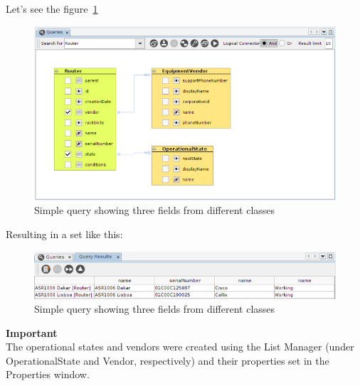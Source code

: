 \documentclass[a4paper]{article}
\begin{document}
	\newpage
	Let's see the figure~\ref{fig:query_multiple_nodes}
	\begin{figure}[h!]
		\centering
		\includegraphics[width=0.8\linewidth]{img/query_multiple_nodes.png}
		\caption{Simple query showing three fields from different classes}
		\label{fig:query_multiple_nodes}
	\end{figure}
	
	Resulting in a set like this:
	\begin{figure}[h!]
		\centering
		\includegraphics[width=0.9\linewidth]{img/query_results_multiple_nodes.png}
		\caption{Simple query showing three fields from different classes}
		\label{fig:query_results_multiple_nodes}
	\end{figure}
	\begin{framed} {\large \textbf{Important}}\\
		The operational states and vendors were created using the List Manager (under OperationalState and Vendor, respectively) and their properties set in the Properties window.
	\end{framed}			
	
\end{document}
